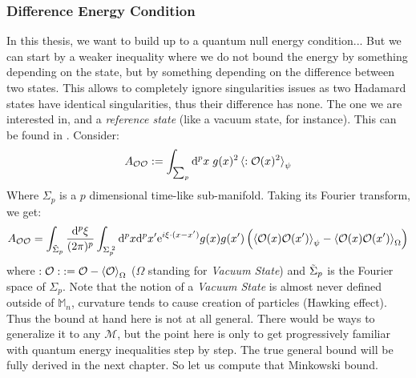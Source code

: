 \documentclass[a4paper,11pt]{article}
\numberwithin{equation}{section}
\theoremstyle{definition}
\renewcommand{\d}{{\mathrm{d}}}
\newcommand{\e}{{\mathrm{e}}}
\begin{document}
\subsubsection{Difference Energy Condition}
In this thesis, we want to build up to a quantum null energy condition... But we can start by a weaker inequality where we do not bound the energy by something depending on the state, but by something depending on the difference between two states. This allows to completely ignore singularities issues as two Hadamard states have identical singularities, thus their difference has none. The one we are interested in, and a \emph{reference state} (like a vacuum state, for instance). This can be found in \cite{DSNEC}.
Consider:
\begin{equation}
    A_{\mathcal{O}\mathcal{O}}:=\int_{\sum_p}\d^px\; g(x)^2\braket{:\mathcal{O}(x)^2}_\psi
\end{equation}
Where $\Sigma_p$ is a $p$ dimensional time-like sub-manifold. Taking its Fourier transform, we get:
\begin{equation}
    A_{\mathcal{O}\mathcal{O}}=\int_{\Tilde{\Sigma}_p}\frac{\d^p\xi}{(2\pi)^p}\int_{\Sigma_p^{\;2}}\d^px\d^px'\e^{i\xi\cdot(x-x')}g(x)g(x')\left(\braket{\mathcal{O}(x)\mathcal{O}(x')}_\psi-\braket{\mathcal{O}(x)\mathcal{O}(x')}_\Omega\right)
\end{equation}
where $:\mathcal{O}: \; := \mathcal{O}-\braket{\mathcal{O}}_\Omega$ ($\Omega$ standing for \emph{Vacuum State}) and $\Tilde{\Sigma}_p$ is the Fourier space of $\Sigma_p$. Note that the notion of a \emph{Vacuum State} is almost never defined outside of $\mathbb{M}_n$, curvature tends to cause creation of particles (Hawking effect). Thus the bound at hand here is not at all general. There would be ways to generalize it to any $\mathcal{M}$, but the point here is only to get progressively familiar with quantum energy inequalities step by step. The true general bound will be fully derived in the next chapter. So let us compute that Minkowski bound.
\end{document}
